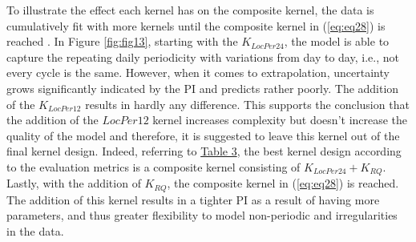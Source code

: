To illustrate the effect each kernel has on the composite kernel, the data is cumulatively fit with more kernels until the composite kernel in (\ref{eq:eq28}) is reached \cite{gp_prices}. In Figure \ref{fig:fig13}, starting with the $K_{LocPer24}$, the model is able to capture the repeating daily periodicity with variations from day to day, i.e., not every cycle is the same. However, when it comes to extrapolation, uncertainty grows significantly indicated by the PI and predicts rather poorly. The addition of the $K_{LocPer12}$ results in hardly any difference. This supports the conclusion that the addition of the $LocPer12$ kernel increases complexity but doesn't increase the quality of the model and therefore, it is suggested to leave this kernel out of the final kernel design. Indeed, referring to \hyperlink{table.3}{Table 3}, the best kernel design according to the evaluation metrics is a composite kernel consisting of $K_{LocPer24} + K_{RQ}$. Lastly, with the addition of $K_{RQ}$, the composite kernel in (\ref{eq:eq28}) is reached. The addition of this kernel results in a tighter PI as a result of having more parameters, and thus greater flexibility to model non-periodic and irregularities in the data.


